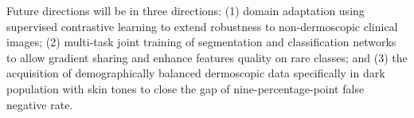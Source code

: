 \documentclass[conference]{IEEEtran}
\begin{document}
Future directions will be in three directions: (1) domain adaptation using supervised contrastive learning to extend robustness to non-dermoscopic clinical images; (2) multi-task joint training of segmentation and classification networks to allow gradient sharing and enhance features quality on rare classes; and (3) the acquisition of demographically balanced dermoscopic data specifically in dark population with skin tones to close the gap of nine-percentage-point false negative rate.



\end{document}

